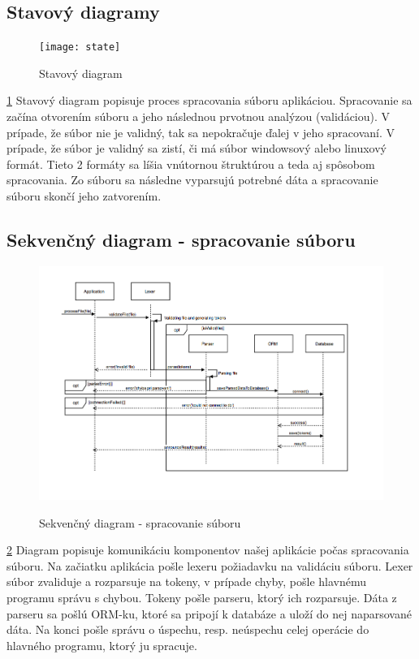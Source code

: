 \documentclass[12pt,a4paper]{article}
\begin{document}
\subsection{Stavový diagramy}
\begin{figure}[H]
	\caption{Stavový diagram}
	\texttt{[image: state]}
	\label{fig:state}
\end{figure}

\ref{fig:state}
Stavový diagram popisuje proces spracovania súboru aplikáciou. Spracovanie sa začína otvorením súboru a jeho následnou prvotnou analýzou (validáciou). V prípade, že súbor nie je validný, tak sa nepokračuje ďalej v jeho spracovaní. V prípade, že súbor je validný sa zistí, či má súbor windowsový alebo linuxový formát. Tieto 2 formáty sa líšia vnútornou štruktúrou a teda aj spôsobom spracovania. Zo súboru sa následne vyparsujú potrebné dáta a spracovanie súboru skončí jeho zatvorením. 

\subsection{Sekvenčný diagram - spracovanie súboru}
\begin{figure}[H]
	\caption{Sekvenčný diagram - spracovanie súboru}
	\includegraphics[width=\textwidth]{sequence_file}
	\label{fig:seq}
\end{figure}

\ref{fig:seq}
Diagram popisuje komunikáciu komponentov našej aplikácie počas spracovania súboru. Na začiatku aplikácia pošle lexeru požiadavku na validáciu súboru. Lexer súbor zvaliduje a rozparsuje na tokeny, v prípade chyby, pošle hlavnému programu správu s chybou. Tokeny pošle parseru, ktorý ich rozparsuje. Dáta z parseru sa pošlú ORM-ku, ktoré sa pripojí k databáze a uloží do nej naparsované dáta. Na konci pošle správu o úspechu, resp. neúspechu celej operácie do hlavného programu, ktorý ju spracuje.
\end{document}

